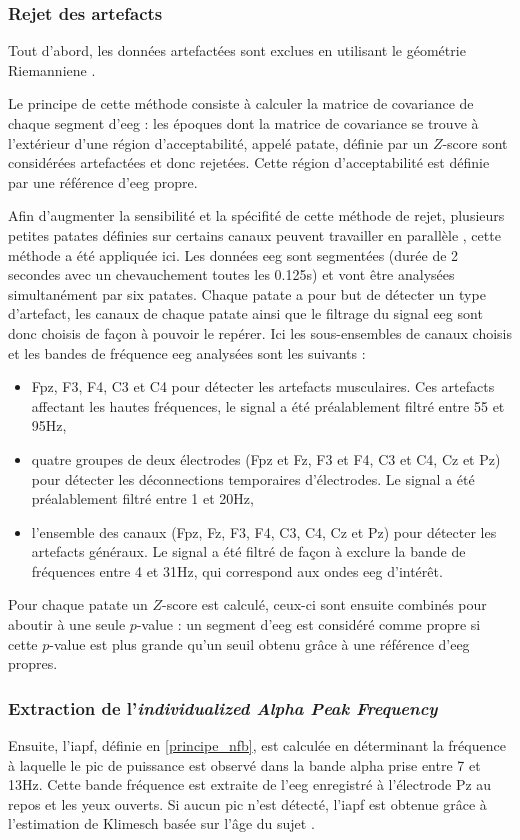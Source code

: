 \subsubsection{Rejet des artefacts}
Tout d'abord, les données artefactées sont exclues en utilisant le géométrie Riemanniene \citep{Barachant2013, Barthelemy2019}. 

Le principe de cette méthode consiste à calculer la matrice de covariance de chaque segment d'\gls{eeg} : les époques dont la matrice de covariance se trouve à l'extérieur d'une région
d'acceptabilité, appelé patate, définie par un $Z$-score sont considérées artefactées et donc rejetées. Cette région d'acceptabilité est définie par une référence d'\gls{eeg} propre.

Afin d'augmenter la sensibilité et la spécifité de cette méthode de rejet, plusieurs petites patates définies sur certains canaux peuvent travailler en parallèle \citep{Barthelemy2019}, 
cette méthode a été appliquée ici.
Les données \gls{eeg} sont segmentées (durée de 2 secondes avec un chevauchement toutes les 0.125s) et vont être analysées simultanément par six patates. Chaque patate a pour but de détecter 
un type d'artefact, les canaux de chaque patate ainsi que le filtrage du signal \gls{eeg} sont donc choisis de façon à pouvoir le repérer. 
Ici les sous-ensembles de canaux choisis et les bandes de fréquence \gls{eeg} analysées sont les suivants :
\begin{itemize}
\item Fpz, F3, F4, C3 et C4 pour détecter les artefacts musculaires. Ces artefacts affectant les hautes fréquences, le signal a été préalablement filtré entre 55 et 95Hz,
\item quatre groupes de deux électrodes (Fpz et Fz, F3 et F4, C3 et C4, Cz et Pz) pour détecter les déconnections temporaires d'électrodes. Le signal a été préalablement filtré entre 1 et 20Hz, 
\item l'ensemble des canaux (Fpz, Fz, F3, F4, C3, C4, Cz et Pz) pour détecter les artefacts généraux. Le signal a été filtré de façon à exclure la bande de fréquences entre 4 et 31Hz, qui correspond
aux ondes \gls{eeg} d'intérêt.
\end{itemize}
Pour chaque patate un $Z$-score est calculé, ceux-ci sont ensuite combinés pour aboutir à une seule $p$-value : un segment d'\gls{eeg} est considéré comme propre si cette $p$-value est 
plus grande qu'un seuil obtenu grâce à une référence d'\gls{eeg} propres. 

\subsubsection{Extraction de l'\textit{individualized Alpha Peak Frequency}} \label{extraction_iapf}
Ensuite, l'\gls{iapf}, définie en \ref{principe_nfb}, est calculée en déterminant la fréquence à laquelle le pic de puissance est observé dans la bande alpha prise entre 7 et 13Hz.
Cette bande fréquence est extraite de l'\gls{eeg} enregistré à l'électrode Pz au repos et les yeux ouverts. 
Si aucun pic n'est détecté, l'\gls{iapf} est obtenue grâce à l'estimation de Klimesch basée sur l'âge du sujet \citep{Klimesch1999}. 

